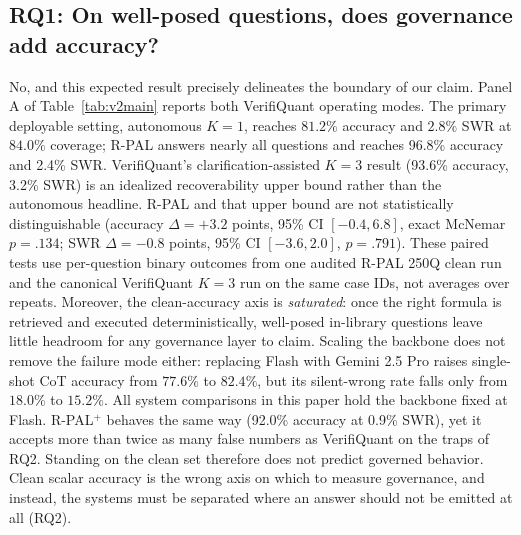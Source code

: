\documentclass[sigconf,anonymous]{acmart}
\newcommand{\vqAccAll}{93.6\%}
\newcommand{\vqSWRAll}{3.2\%}
\newcommand{\rpalAccAll}{96.8\%}
\newcommand{\rpalSWRAll}{2.4\%}
\newcommand{\govPromptAccAll}{92.0\%}
\newcommand{\govPromptSWRAll}{0.9\%}
\begin{document}
\subsection{RQ1: On well-posed questions, does governance add accuracy?}
No, and this expected result precisely delineates the boundary of our claim.
Panel A of Table~\ref{tab:v2main} reports both VerifiQuant operating modes. The primary deployable setting, autonomous $K{=}1$, reaches $81.2\%$ accuracy and $2.8\%$ SWR at $84.0\%$ coverage; R-PAL answers nearly all questions and reaches \rpalAccAll{} accuracy and \rpalSWRAll{} SWR. VerifiQuant's clarification-assisted $K{=}3$ result (\vqAccAll{} accuracy, \vqSWRAll{} SWR) is an idealized recoverability upper bound rather than the autonomous headline. R-PAL and that upper bound are not statistically distinguishable (accuracy $\Delta{=}{+}3.2$ points, 95\% CI $[-0.4, 6.8]$, exact McNemar $p{=}.134$; SWR $\Delta{=}{-}0.8$ points, 95\% CI $[-3.6, 2.0]$, $p{=}.791$). These paired tests use per-question binary outcomes from one audited R-PAL 250Q clean run and the canonical VerifiQuant $K{=}3$ run on the same case IDs, not averages over repeats. %
Moreover, the clean-accuracy axis is \emph{saturated}: once the right formula is retrieved and executed deterministically, well-posed in-library questions leave little headroom for any governance layer to claim.
Scaling the backbone does not remove the failure mode either: replacing Flash with Gemini 2.5 Pro raises single-shot CoT accuracy from $77.6\%$ to $82.4\%$, but its silent-wrong rate falls only from $18.0\%$ to $15.2\%$. All system comparisons in this paper hold the backbone fixed at Flash.
R-PAL$^{+}$ behaves the same way (\govPromptAccAll{} accuracy at \govPromptSWRAll{} SWR), yet it accepts more than twice as many false numbers as VerifiQuant on the traps of RQ2. Standing on the clean set therefore does not predict governed behavior.
Clean scalar accuracy is the wrong axis on which to measure governance, and instead, the systems must be separated where an answer should not be emitted at all (RQ2).
\end{document}
